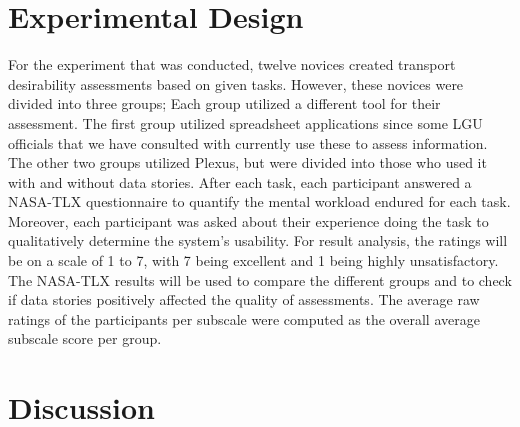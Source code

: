 \documentclass{sigchi}
\begin{document}
\section{Experimental Design}
For the experiment that was conducted, twelve novices created transport desirability assessments based on given tasks. However, these novices were divided into three groups; Each group utilized a different tool for their assessment. The first group utilized spreadsheet applications since some LGU officials that we have consulted with currently use these to assess information. The other two groups utilized Plexus, but were divided into those who used it with and without data stories. After each task, each participant answered a NASA-TLX questionnaire to quantify the mental workload endured for each task. Moreover, each participant was asked about their experience doing the task to qualitatively determine the system's usability. For result analysis, the ratings will be on a scale of 1 to 7, with 7 being excellent and 1 being highly unsatisfactory. The NASA-TLX results will be used to compare the different groups and to check if data stories positively affected the quality of assessments. The average raw ratings of the participants per subscale were computed as the overall average subscale score per group.


\section{Discussion}
\end{document}
